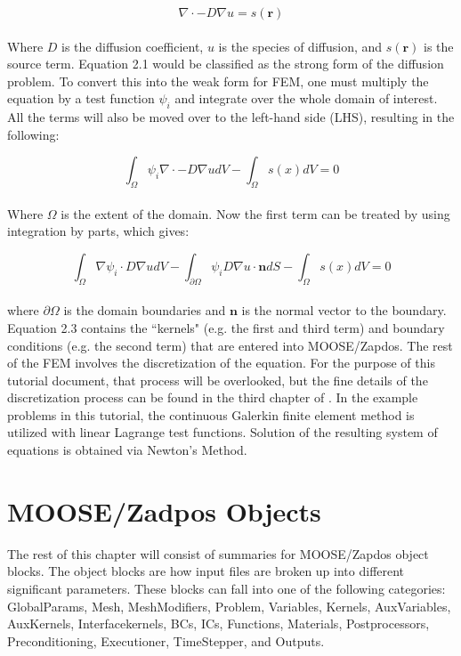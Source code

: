 \documentclass[final]{report}
\begin{document}
  \begin{equation}
      \nabla\cdot -D\nabla u = s(\mathbf{r})
  \end{equation}
  \\
  Where $D$ is the diffusion coefficient, $u$ is the species of diffusion, and $s(\mathbf{r})$ is the source term. Equation 2.1 would be classified as the strong form of the diffusion problem. To convert this into the weak form for FEM, one must multiply the equation by a test function $\psi_{i}$ and integrate over the whole domain of interest. All the terms will also be moved over to the left-hand side (LHS), resulting in the following:

  \begin{equation}
      \int_{\Omega}\psi_{i}\nabla\cdot -D\nabla u dV - \int_{\Omega} s(x) dV = 0
  \end{equation}
  \\
  Where $\Omega$ is the extent of the domain. Now the first term can be treated by using integration by parts, which gives:

    \begin{equation}
      \int_{\Omega}\nabla\psi_{i}\cdot D\nabla u dV - \int_{\partial\Omega}\psi_{i}D\nabla u\cdot \mathbf{n} dS - \int_{\Omega} s(x) dV = 0
  \end{equation}
  \\
  where $\partial\Omega$ is the domain boundaries and $\mathbf{n}$ is the normal vector to the boundary. Equation 2.3 contains the ``kernels" (e.g. the first and third term) and boundary conditions (e.g. the second term) that are entered into MOOSE/Zapdos. The rest of the FEM involves the discretization of the equation. For the purpose of this tutorial document, that process will be overlooked, but the fine details of the discretization process can be found in the third chapter of \cite{Alex_thesis}. In the example problems in this tutorial, the continuous Galerkin finite element method is utilized with linear Lagrange test functions. Solution of the resulting system of equations is obtained via Newton's Method.
  \section{MOOSE/Zadpos Objects}
  The rest of this chapter will consist of summaries for MOOSE/Zapdos object blocks. The object blocks are how input files are broken up into different significant parameters. These blocks can fall into one of the following categories: GlobalParams, Mesh, MeshModifiers, Problem, Variables, Kernels, AuxVariables, AuxKernels, Interfacekernels, BCs, ICs, Functions, Materials, Postprocessors, Preconditioning, Executioner, TimeStepper, and Outputs.
\end{document}
